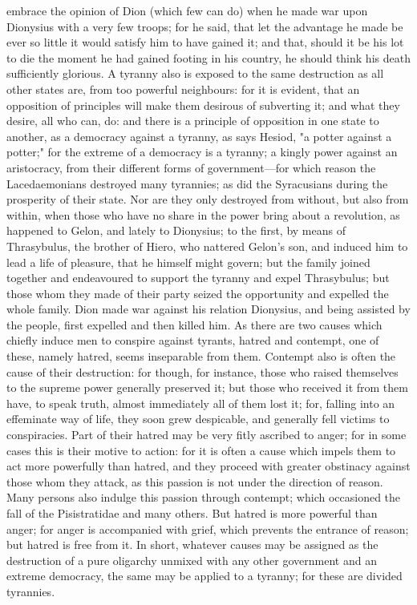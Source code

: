 \documentclass[12pt]{article}
\begin{document}
embrace the opinion of Dion (which few can do) when he made war upon Dionysius with a very few troops; for he said, that let the advantage he made be ever so little it would satisfy him to have gained it; and that, should it be his lot to die the moment he had gained footing in his country, he should think his death sufficiently glorious. A tyranny also is exposed to the same destruction as all other states are, from too powerful neighbours: for it is evident, that an opposition of principles will make them desirous of subverting it; and what they desire, all who can, do: and there is a principle of opposition in one state to another, as a democracy against a tyranny, as says Hesiod, "a potter against a potter;" for the extreme of a democracy is a tyranny; a kingly power against an aristocracy, from their different forms of government---for which reason the Lacedaemonians destroyed many tyrannies; as did the Syracusians during the prosperity of their state. Nor are they only destroyed from without, but also from within, when those who have no share in the power bring about a revolution, as happened to Gelon, and lately to Dionysius; to the first, by means of Thrasybulus, the brother of Hiero, who nattered Gelon's son, and induced him to lead a life of pleasure, that he himself might govern; but the family joined together and endeavoured to support the tyranny and expel Thrasybulus; but those whom they made of their party seized the opportunity and expelled the whole family. Dion made war against his relation Dionysius, and being assisted by the people, first expelled and then killed him. As there are two causes which chiefly induce men to conspire against tyrants, hatred and contempt, one of these, namely hatred, seems inseparable from them. Contempt also is often the cause of their destruction: for though, for instance, those who raised themselves to the supreme power generally preserved it; but those who received it from them have, to speak truth, almost immediately all of them lost it; for, falling into an effeminate way of life, they soon grew despicable, and generally fell victims to conspiracies. Part of their hatred may be very fitly ascribed to anger; for in some cases this is their motive to action: for it is often a cause which impels them to act more powerfully than hatred, and they proceed with greater obstinacy against those whom they attack, as this passion is not under the direction of reason. Many persons also indulge this passion through contempt; which occasioned the fall of the Pisistratidae and many others. But hatred is more powerful than anger; for anger is accompanied with grief, which prevents the entrance of reason; but hatred is free from it. In short, whatever causes may be assigned as the destruction of a pure oligarchy unmixed with any other government and an extreme democracy, the same may be applied to a tyranny; for these are divided tyrannies.
\end{document}
